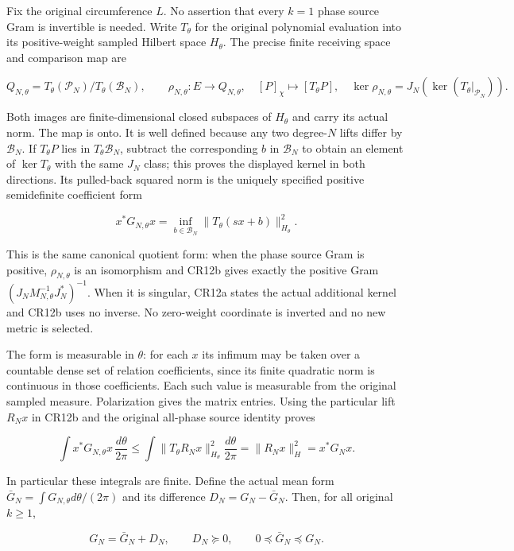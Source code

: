 Fix the original circumference \(L\). No assertion that every \(k=1\) phase source Gram is invertible is needed. Write \(T_\theta\) for the original polynomial evaluation into its positive-weight sampled Hilbert space \(H_\theta\). The precise finite receiving space and comparison map are

\[
Q_{N,\theta}=T_\theta(\mathcal P_N)/T_\theta(\mathcal B_N),\qquad
\rho_{N,\theta}:E\longrightarrow Q_{N,\theta},\quad
[P]_\chi\longmapsto[T_\theta P],\quad
\ker\rho_{N,\theta}=J_N(\ker(T_\theta|_{\mathcal P_N})).
\tag{CR12a}
\]

Both images are finite-dimensional closed subspaces of \(H_\theta\) and carry its actual norm. The map is onto. It is well defined because any two degree-\(N\) lifts differ by \(\mathcal B_N\). If \(T_\theta P\) lies in \(T_\theta\mathcal B_N\), subtract the corresponding \(b\) in \(\mathcal B_N\) to obtain an element of \(\ker T_\theta\) with the same \(J_N\) class; this proves the displayed kernel in both directions. Its pulled-back squared norm is the uniquely specified positive semidefinite coefficient form

\[
x^*G_{N,\theta}x
=\inf_{b\in\mathcal B_N}\|T_\theta(sx+b)\|_{H_\theta}^2.
\tag{CR12b}
\]

This is the same canonical quotient form: when the phase source Gram is positive, \(\rho_{N,\theta}\) is an isomorphism and CR12b gives exactly the positive Gram \((J_NM_{N,\theta}^{-1}J_N^*)^{-1}\). When it is singular, CR12a states the actual additional kernel and CR12b uses no inverse. No zero-weight coordinate is inverted and no new metric is selected.

The form is measurable in \(\theta\): for each \(x\) its infimum may be taken over a countable dense set of relation coefficients, since its finite quadratic norm is continuous in those coefficients. Each such value is measurable from the original sampled measure. Polarization gives the matrix entries. Using the particular lift \(R_Nx\) in CR12b and the original all-phase source identity proves

\[
\int x^*G_{N,\theta}x\,\frac{d\theta}{2\pi}
\le\int\|T_\theta R_Nx\|_{H_\theta}^2\frac{d\theta}{2\pi}
=\|R_Nx\|_H^2=x^*G_Nx.
\tag{CR12c}
\]

In particular these integrals are finite. Define the actual mean form \(\bar G_N=\int G_{N,\theta}d\theta/(2\pi)\) and its difference \(D_N=G_N-\bar G_N\). Then, for all original \(k\ge1\),

\[
G_N=\bar G_N+D_N,\qquad D_N\succeq0,
\qquad 0\preceq\bar G_N\preceq G_N.
\tag{CR12}
\]

